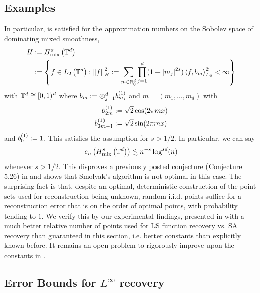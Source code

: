 \documentclass[12pt, oneside]{amsart}
\theoremstyle{definition}
\theoremstyle{remark}
\numberwithin{equation}{section}
\begin{document}
\subsection*{Examples}
In particular,  is satisfied for the 
approximation numbers on the Sobolev space of dominating mixed smoothness, 
\begin{align*}
	H &\defn H_{\text{mix}}^s\left(\T^d\right)\\
	&\defn \set{f \in L_2\left(\T^d\right) : \norm[H]{f}^2 \defn \sum_{m \in 
			\N_0^d} \prod_{j=1}^d (1+\abs{m_j}^{2s}) \inner{f}{b_m}^2_{L_2} < 
			\infty}
\end{align*}
with \(\T^d \cong [0, 1)^d\) 
where \(b_m \defn \otimes_{j=1}^d b_{m_j}^{(1)}\) and \(m = (m_1, \dots, m_d)\) 
with \begin{align*}
	b_{2m}^{(1)} &\defn \sqrt{2}\cos(2\pi m x)\\
	b_{2m-1}^{(1)} &\defn \sqrt{2}\sin(2\pi m x)
\end{align*}
and \(b_0^{(1)} \defn 1\). This satisfies the assumption for \(s > 1/2\). In 
particular, we can say
\begin{equation}\label{eq:conclusio}
	e_n\left( H_{\text{mix}}^s\left(\T^d\right) \right) \lesssim 
	n^{-s}\log^{sd}(n)
\end{equation}
whenever \(s > 1/2\). This disproves a previously posted conjecture (Conjecture 
5.26) in \cite{Dung_Temlyakov_Ullrich_2018} and shows that Smolyak's algorithm 
is not optimal in this case. The surprising fact is that, despite an optimal, 
deterministic construction of the point sets used for reconstruction being 
unknown, random i.i.d. points suffice for a reconstruction error that is on the 
order of optimal points, with probability tending to \(1\). We verify this by 
our experimental findings, presented in  with a 
much better relative number of points used for LS function recovery vs. SA 
recovery than guaranteed in this section, i.e. better constants than explicitly 
known before. It remains an open problem to rigorously improve upon the 
constants in .

\subsection{Error Bounds for \texorpdfstring{\(L^\infty\)}{} recovery}
\end{document}
